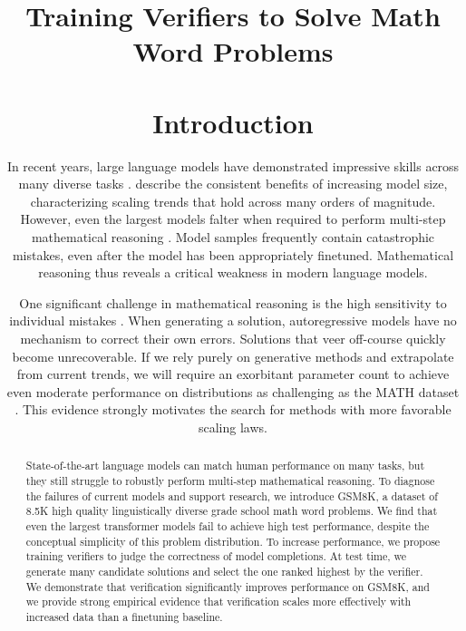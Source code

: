 \title{{\Large Training Verifiers to Solve Math Word Problems}



\maketitle

\vspace{-.5cm}
\begin{abstract}

State-of-the-art language models can match human performance on many tasks, but they still struggle to robustly perform multi-step mathematical reasoning. To diagnose the failures of current models and support research, we introduce GSM8K, a dataset of 8.5K high quality linguistically diverse grade school math word problems. We find that even the largest transformer models fail to achieve high test performance, despite the conceptual simplicity of this problem distribution. To increase performance, we propose training verifiers to judge the correctness of model completions. At test time, we generate many candidate solutions and select the one ranked highest by the verifier. We demonstrate that verification significantly improves performance on GSM8K, and we provide strong empirical evidence that verification scales more effectively with increased data than a finetuning baseline.

\end{abstract}

\section{Introduction}

In recent years, large language models have demonstrated impressive skills across many diverse tasks \citep{wang2019superglue, brown2020language}. \cite{kaplan2020scaling} describe the consistent benefits of increasing model size, characterizing scaling trends that hold across many orders of magnitude. However, even the largest models falter when required to perform multi-step mathematical reasoning \citep{hendrycks2021measuring}. Model samples frequently contain catastrophic mistakes, even after the model has been appropriately finetuned. Mathematical reasoning thus reveals a critical weakness in modern language models.

One significant challenge in mathematical reasoning is the high sensitivity to individual mistakes \citep{shen2021generate}. When generating a solution, autoregressive models have no mechanism to correct their own errors. Solutions that veer off-course quickly become unrecoverable. If we rely purely on generative methods and extrapolate from current trends, we will require an exorbitant parameter count to achieve even moderate performance on distributions as challenging as the MATH dataset \citep{hendrycks2021measuring}. This evidence strongly motivates the search for methods with more favorable scaling laws.

}
